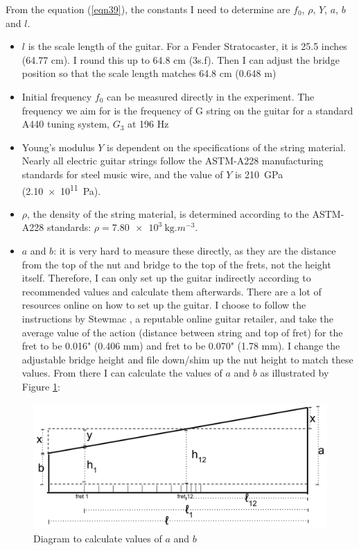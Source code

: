 From the equation (\ref{eqn39}), the constants I need to determine are $f_0$, $\rho$, $Y$, $a$, $b$ and $l$. 
\begin{itemize}
    \item $l$ is the scale length of the guitar. For a Fender Stratocaster, it is 25.5 inches (64.77 cm). \cite{scale} I round this up to 64.8 cm (3s.f). Then I can adjust the bridge position so that the scale length matches 64.8 cm (0.648 m)
    \item Initial frequency $f_0$ can be measured directly in the experiment. The frequency we aim for is the frequency of G string on the guitar for a standard A440 tuning system, $G_3$ at 196 Hz \cite{freq_chart}
    \item Young's modulus $Y$ is dependent on the specifications of the string material. Nearly all electric guitar strings follow the ASTM-A228 manufacturing standards for steel music wire, and the value of $Y$ is \SI{210}{\giga\pascal} (\SI{2.10e11}{\pascal}). \cite{astm} 
    \item $\rho$, the density of the string material, is determined according to the ASTM-A228 standards: $\rho = \SI{7.80e3}{\kg.m^{-3}}$. \cite{astm}
    \item $a$ and $b$: it is very hard to measure these directly, as they are the distance from the top of the nut and bridge to the top of the frets, not the height itself. Therefore, I can only set up the guitar indirectly according to recommended values and calculate them afterwards. There are a lot of resources online on how to set up the guitar. I choose to follow the instructions by Stewmac \cite{stewmac}, a reputable online guitar retailer, and take the average value of the action (distance between string and top of fret) for the  fret to be 0.016" (0.406 mm) and  fret to be 0.070" (1.78 mm). I change the adjustable bridge height and file down/shim up the nut height to match these values. From there I can calculate the values of $a$ and $b$ as illustrated by Figure \ref{fig3}: \par
\end{itemize}
\begin{figure}[!htbp]
    \includegraphics[width = \textwidth]{./ee/fig4.png}
    \caption{Diagram to calculate values of $a$ and $b$} \label{fig3}
\end{figure}
